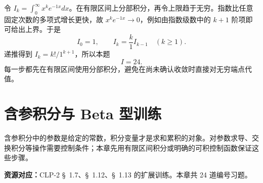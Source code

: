 \documentclass[12pt,fontset=fandol]{ctexart}
\begin{document}
\begin{solve}\label{ans:c19q25}
令 $I_k=\int_0^\infty x^ke^{-1x}dx$。在有限区间上分部积分，再令上限趋于无穷。指数比任意固定次数的多项式增长更快，故 $x^ke^{-1x}\to0$，例如由指数级数中的 $k+1$ 阶项即可给出上界。于是
\[
I_0=1,\qquad I_k=\frac k{1}I_{k-1}\quad(k\ge1).
\]
递推得到 $I_k=k!/1^{k+1}$，所以本题
\[
I=24.
\]
每一步都先在有限区间使用分部积分，避免在尚未确认收敛时直接对无穷端点代值。
\end{solve}

\clearpage
\section{含参积分与 Beta 型训练}\label{sec:ch20}
含参积分中的参数是给定的常数，积分变量才是求和累积的对象。对参数求导、交换积分等操作需要控制条件；本章先用有限区间积分或明确的可积控制函数保证这些步骤。

\textbf{资源对应：}CLP-2 \S~1.7、\S~1.12、\S~1.13 的扩展训练。本章共 24 道编号习题。
\end{document}
